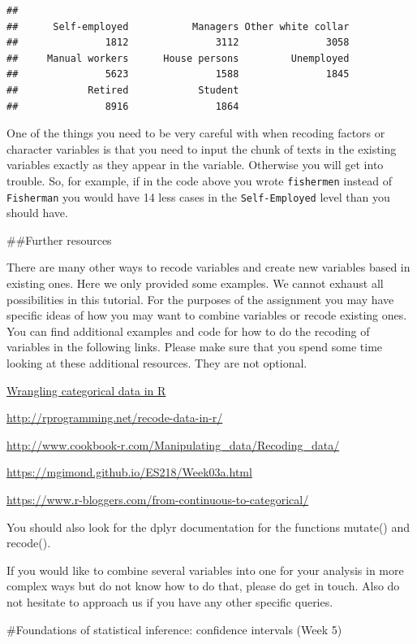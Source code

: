 \documentclass[]{book}
\theoremstyle{definition}
\theoremstyle{definition}
\theoremstyle{definition}
\theoremstyle{remark}
\begin{document}
\begin{verbatim}
## 
##      Self-employed           Managers Other white collar 
##               1812               3112               3058 
##     Manual workers      House persons         Unemployed 
##               5623               1588               1845 
##            Retired            Student 
##               8916               1864
\end{verbatim}

One of the things you need to be very careful with when recoding factors
or character variables is that you need to input the chunk of texts in
the existing variables exactly as they appear in the variable. Otherwise
you will get into trouble. So, for example, if in the code above you
wrote \texttt{fishermen} instead of \texttt{Fisherman} you would have 14
less cases in the \texttt{Self-Employed} level than you should have.

\#\#Further resources

There are many other ways to recode variables and create new variables
based in existing ones. Here we only provided some examples. We cannot
exhaust all possibilities in this tutorial. For the purposes of the
assignment you may have specific ideas of how you may want to combine
variables or recode existing ones. You can find additional examples and
code for how to do the recoding of variables in the following links.
Please make sure that you spend some time looking at these additional
resources. They are not optional.

\href{https://peerj.com/preprints/3163.pdf}{Wrangling categorical data
in R}

\url{http://rprogramming.net/recode-data-in-r/}

\url{http://www.cookbook-r.com/Manipulating_data/Recoding_data/}

\url{https://mgimond.github.io/ES218/Week03a.html}

\url{https://www.r-bloggers.com/from-continuous-to-categorical/}

You should also look for the dplyr documentation for the functions
mutate() and recode().

If you would like to combine several variables into one for your
analysis in more complex ways but do not know how to do that, please do
get in touch. Also do not hesitate to approach us if you have any other
specific queries.

\#Foundations of statistical inference: confidence intervals (Week 5)
\end{document}
